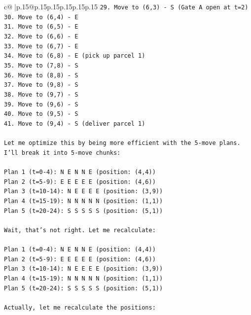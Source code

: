 \documentclass{article}
\begin{document}
{\begin{supertabular}{c@{$\;$}|p{.15\linewidth}@{}p{.15\linewidth}p{.15\linewidth}p{.15\linewidth}p{.15\linewidth}p{.15\linewidth}}
{{{\texttt{29. Move to (6,3) {-} S (Gate A open at t=2)} \\
\texttt{30. Move to (6,4) {-} E} \\
\texttt{31. Move to (6,5) {-} E} \\
\texttt{32. Move to (6,6) {-} E} \\
\texttt{33. Move to (6,7) {-} E} \\
\texttt{34. Move to (6,8) {-} E (pick up parcel 1)} \\
\texttt{35. Move to (7,8) {-} S} \\
\texttt{36. Move to (8,8) {-} S} \\
\texttt{37. Move to (9,8) {-} S} \\
\texttt{38. Move to (9,7) {-} S} \\
\texttt{39. Move to (9,6) {-} S} \\
\texttt{40. Move to (9,5) {-} S} \\
\texttt{41. Move to (9,4) {-} S (deliver parcel 1)} \\
\\ 
\texttt{Let me optimize this by being more efficient with the 5{-}move plans. I'll break it into 5{-}move chunks:} \\
\\ 
\texttt{Plan 1 (t=0{-}4): N E N N E (position: (4,4))} \\
\texttt{Plan 2 (t=5{-}9): E E E E E (position: (4,6))} \\
\texttt{Plan 3 (t=10{-}14): N E E E E (position: (3,9))} \\
\texttt{Plan 4 (t=15{-}19): N N N N N (position: (1,1))} \\
\texttt{Plan 5 (t=20{-}24): S S S S S (position: (5,1))} \\
\\ 
\texttt{Wait, that's not right. Let me recalculate:} \\
\\ 
\texttt{Plan 1 (t=0{-}4): N E N N E (position: (4,4))} \\
\texttt{Plan 2 (t=5{-}9): E E E E E (position: (4,6))} \\
\texttt{Plan 3 (t=10{-}14): N E E E E (position: (3,9))} \\
\texttt{Plan 4 (t=15{-}19): N N N N N (position: (1,1))} \\
\texttt{Plan 5 (t=20{-}24): S S S S S (position: (5,1))} \\
\\ 
\texttt{Actually, let me recalculate the positions:} \\
}}}
\end{supertabular}}
\end{document}
